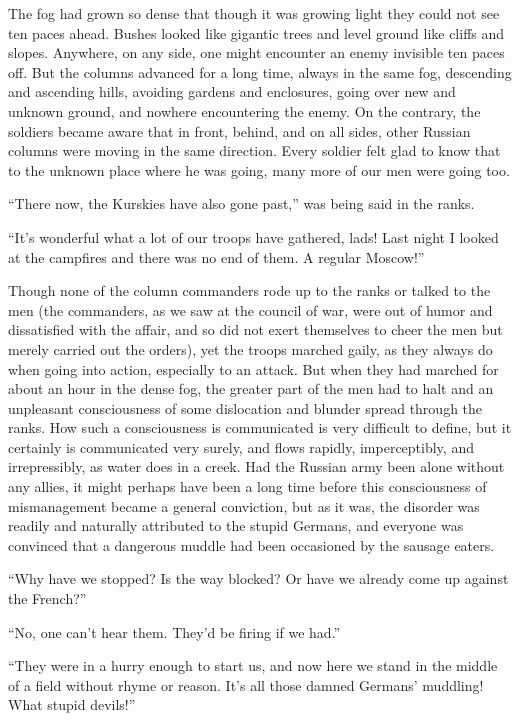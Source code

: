 The fog had grown so dense that though it was growing light they
could not see ten paces ahead. Bushes looked like gigantic trees
and level ground like cliffs and slopes. Anywhere, on any side,
one might encounter an enemy invisible ten paces off. But the
columns advanced for a long time, always in the same fog,
descending and ascending hills, avoiding gardens and enclosures,
going over new and unknown ground, and nowhere encountering the
enemy. On the contrary, the soldiers became aware that in front,
behind, and on all sides, other Russian columns were moving in
the same direction. Every soldier felt glad to know that to the
unknown place where he was going, many more of our men were going
too.

``There now, the Kurskies have also gone past,'' was being said
in the ranks.

``It's wonderful what a lot of our troops have gathered, lads!
Last night I looked at the campfires and there was no end of
them. A regular Moscow!''

Though none of the column commanders rode up to the ranks or
talked to the men (the commanders, as we saw at the council of
war, were out of humor and dissatisfied with the affair, and so
did not exert themselves to cheer the men but merely carried out
the orders), yet the troops marched gaily, as they always do when
going into action, especially to an attack. But when they had
marched for about an hour in the dense fog, the greater part of
the men had to halt and an unpleasant consciousness of some
dislocation and blunder spread through the ranks. How such a
consciousness is communicated is very difficult to define, but it
certainly is communicated very surely, and flows rapidly,
imperceptibly, and irrepressibly, as water does in a creek. Had
the Russian army been alone without any allies, it might perhaps
have been a long time before this consciousness of mismanagement
became a general conviction, but as it was, the disorder was
readily and naturally attributed to the stupid Germans, and
everyone was convinced that a dangerous muddle had been
occasioned by the sausage eaters.

``Why have we stopped? Is the way blocked? Or have we already
come up against the French?''

``No, one can't hear them. They'd be firing if we had.''

``They were in a hurry enough to start us, and now here we stand
in the middle of a field without rhyme or reason. It's all those
damned Germans' muddling! What stupid devils!''

